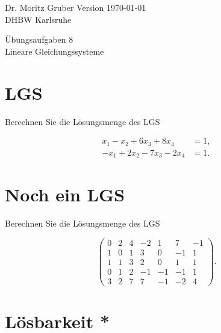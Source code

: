 




\vspace*{-20mm}
{
	\color{dhbwGray}
	Dr. Moritz Gruber	\hfill Version \today\\
	DHBW Karlsruhe\\
}

\vspace{10mm}
\begin{center}
	{
		\color{lightBlue}
		{ \LARGE 	Übungsaufgaben 8}\\[3mm]
		{\Large Lineare Gleichungssysteme}
	}
\end{center}

\vspace{5mm}



\section{LGS }

Berechnen Sie die L\"osungsmenge des LGS

\begin{align*}
	x_1 - x_2 + 6x_3 + 8x_4 &= 1,\\
	-x_1 +2x_2 - 7x_3-2x_4 &= 1.
\end{align*}

\section{Noch ein LGS}

Berechnen Sie die L\"osungsmenge des LGS

$$
	\left(
	\begin{array}{cccccc|c}
		0	& 2	& 4	& -2 	& 1	& 7	& -1\\
		1	& 0	& 1	& 3	& 0	& -1	& 1\\
		1	& 1	& 3	& 2	& 0	& 1	& 1\\
		0	& 1	& 2	& -1	& -1	& -1	& 1\\
		3	& 2	& 7	& 7	& -1	& -2	& 4
	\end{array}
	\right).
$$

\section{L\"osbarkeit *}

